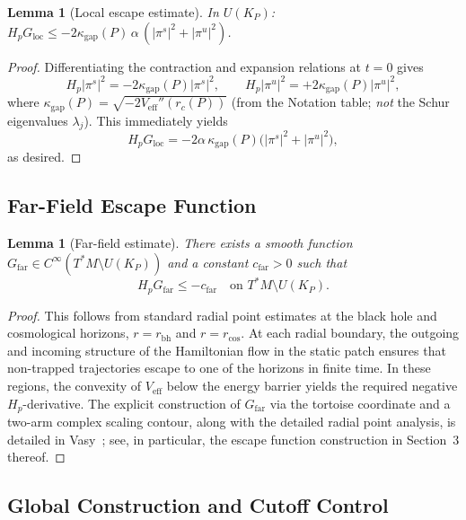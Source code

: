 \documentclass[12pt,a4paper]{amsart}
\newtheorem{lemma}[theorem]{Lemma}
\theoremstyle{remark}
\begin{document}
\begin{lemma}[Local escape estimate]
\label{lem:local_escape}
In $U(K_P)$: $H_p G_{\mathrm{loc}} \leq -2\kappa_{\mathrm{gap}}(P)\,\alpha\,(|\pi^s|^2 + |\pi^u|^2)$.
\end{lemma}

\begin{proof}
Differentiating the contraction and expansion relations at $t=0$ gives
\[
  H_p|\pi^s|^2 = -2\kappa_{\mathrm{gap}}(P)|\pi^s|^2,\qquad
  H_p|\pi^u|^2 = +2\kappa_{\mathrm{gap}}(P)|\pi^u|^2,
\]
where $\kappa_{\mathrm{gap}}(P) = \sqrt{-2V_{\mathrm{eff}}''(r_c(P))}$
(from the Notation table; \emph{not} the Schur eigenvalues $\lambda_j$).
This immediately yields
\[
  H_pG_{\mathrm{loc}}
  = -2\alpha\,\kappa_{\mathrm{gap}}(P)\bigl(|\pi^s|^2 + |\pi^u|^2\bigr),
\]
as desired.
\end{proof}

\subsection{Far-Field Escape Function}

\begin{lemma}[Far-field estimate]
\label{lem:far_escape}
There exists a smooth function $G_{\mathrm{far}} \in C^\infty(T^*M \setminus U(K_P))$
and a constant $c_{\mathrm{far}} > 0$ such that
\[
H_p G_{\mathrm{far}} \leq -c_{\mathrm{far}}
\quad \text{on } T^*M \setminus U(K_P).
\]
\end{lemma}

\begin{proof}
This follows from standard radial point estimates at the black hole and
cosmological horizons, $r = r_{\mathrm{bh}}$ and $r = r_{\mathrm{cos}}$.
At each radial boundary, the outgoing and incoming structure of the Hamiltonian flow
in the static patch ensures that non-trapped trajectories escape to
one of the horizons in finite time. In these regions, the convexity of
$V_{\mathrm{eff}}$ below the energy barrier yields the required negative
$H_p$-derivative.
The explicit construction of $G_{\mathrm{far}}$ via the tortoise coordinate
and a two-arm complex scaling contour, along with the detailed radial point analysis,
is detailed in Vasy~\cite{Vasy2013}; see, in particular, the escape function
construction in Section~3 thereof.
\end{proof}

\subsection{Global Construction and Cutoff Control}
\end{document}
